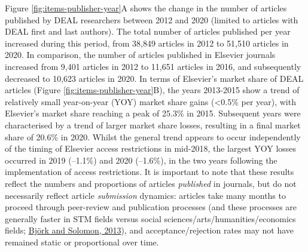 \documentclass[
]{article}
\begin{document}
Figure \ref{fig:items-publisher-year}A shows the change in the number of articles published by DEAL researchers between 2012 and 2020 (limited to articles with DEAL first and last authors). The total number of articles published per year increased during this period, from 38,849 articles in 2012 to 51,510 articles in 2020. In comparison, the number of
articles published in Elsevier journals increased from 9,401 articles in 2012 to 11,651 articles in 2016, and subsequently decreased to 10,623 articles in 2020. In terms of Elsevier's market share of DEAL articles (Figure \ref{fig:items-publisher-year}B), the years 2013-2015 show a trend of relatively small year-on-year (YOY) market share gains (\textless0.5\% per year), with Elsevier's market share reaching a peak of 25.3\% in 2015. Subsequent years were characterised by a trend of larger market share losses, resulting in a final market share of 20.6\% in 2020. Whilst the general trend appears to occur independently of the timing of Elsevier access restrictions in mid-2018, the largest YOY losses occurred in 2019 (--1.1\%) and 2020 (--1.6\%), in the two years following the implementation of access restrictions. It is important to note that these results reflect the numbers and proportions of articles \emph{published} in journals, but do not necessarily reflect article \emph{submission} dynamics: articles take many months to proceed through peer-review and publication processes (and these processes are generally faster in STM fields versus social sciences/arts/humanities/economics fields; \href{https://doi.org/10.1016/j.joi.2013.09.001}{Björk and Solomon, 2013}), and acceptance/rejection rates may not have remained static or proportional over time.
\end{document}
